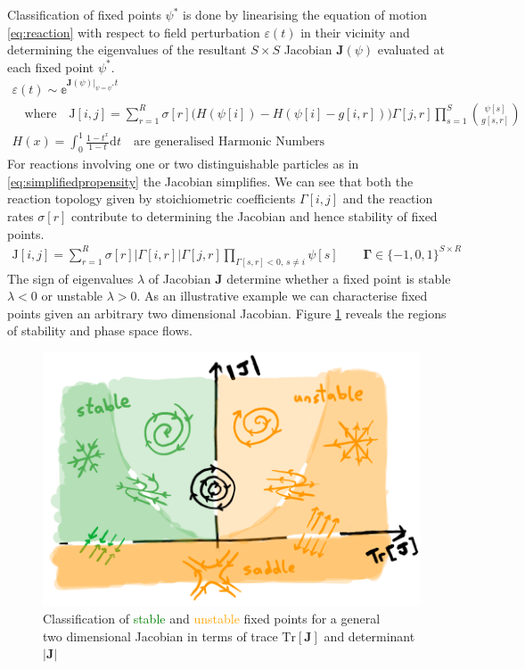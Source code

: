 \documentclass{article}[12pt]
\numberwithin{equation}{section}
\begin{document}
Classification of fixed points $\psi^*$ is done by linearising the equation of motion
\eqref{eq:reaction} with respect to field perturbation $\varepsilon(t)$ in their vicinity
and determining the eigenvalues of the resultant $S\times S$ Jacobian $\mathbf{J}(\psi)$
evaluated at each fixed point $\psi^*$.
\begin{align}
	\varepsilon(t) \sim
	\mathbb{e}^{\mathbf{J}(\psi)|_{\psi=\psi^*}t}\qquad\qquad\qquad\qquad\qquad\qquad
	\\
	\quad\text{where}\quad
	\mathrm{J}[i,j]=
	\sum_{r=1}^R
	\sigma[r]
\bigg(H(\psi[i])-H(\psi[i]-g[i,r])\bigg)
	\Gamma[j,r]
		\prod_{s=1}^S{\psi[s] \choose g[s,r]}
	\\
	H(x)=\int_0^1\frac{1-t^x}{1-t}\mathrm{d}t\quad
	\text{are generalised Harmonic Numbers}\qquad
	\label{eq:linearstability}
\end{align}
For reactions involving one or two distinguishable particles as
in \eqref{eq:simplifiedpropensity} the Jacobian simplifies. We can see that
both the reaction topology given by stoichiometric coefficients $\Gamma[i,j]$ and
the reaction rates $\sigma[r]$ contribute to determining the Jacobian and hence
stability of fixed points.
\begin{align}
	\mathrm{J}[i,j]=
	\sum_{r=1}^R
		\sigma[r]|\Gamma[i,r]|\Gamma[j,r]
		\prod_{\Gamma[s,r]<0,\,s\neq i}
		\psi[s]
		\qquad \mathbf{\Gamma}\in\{-1,0,1\}^{S\times R}
	\label{eq:simplifiedjacobian}
\end{align}
The sign of eigenvalues $\lambda$ of Jacobian $\mathbf{J}$ determine whether a fixed point
is stable $\lambda<0$ or unstable $\lambda>0$. As an illustrative example we can characterise
fixed points given an arbitrary two dimensional Jacobian. Figure \ref{fig:stability} reveals
the regions of stability and phase space flows.
\begin{figure}[H]
\centering{}
\captionsetup{justification=centering}
\includegraphics[scale=0.35]{figures/stability}
\caption{Classification of \textcolor{Green}{stable} and \textcolor{orange}{unstable}
fixed points for a general \\two dimensional Jacobian in terms of trace $\mathrm{Tr}[\mathbf{J}]$ and
determinant $|\mathbf{J}|$}
\label{fig:stability}
\end{figure}
\end{document}
